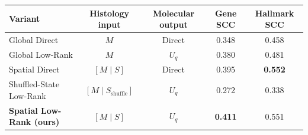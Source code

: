 %
%
%
%
\begin{tabular}{lcccc}
\toprule
Variant & Histology input & Molecular output & Gene SCC & Hallmark SCC\\
\midrule
Global Direct & $M$ & Direct & 0.348 & 0.458\\
Global Low-Rank & $M$ & $U_q$ & 0.380 & 0.481\\
Spatial Direct & $[M\mid S]$ & Direct & 0.395 & \textbf{0.552}\\
\midrule
Shuffled-State Low-Rank & $[M\mid S_{\mathrm{shuffle}}]$ & $U_q$ & 0.272 & 0.338\\
\textbf{Spatial Low-Rank (ours)} & $[M\mid S]$ & $U_q$ & \textbf{0.411} & 0.551\\
\bottomrule
\end{tabular}